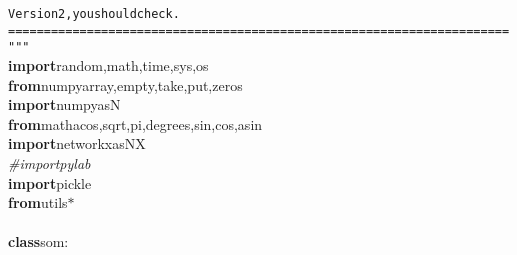 {{\begin{tabbing}
{\texttt{Version\hspace{6pt}2,\hspace{6pt}you\hspace{6pt}should\hspace{6pt}check.}}\\
{\texttt{======================================================================}}\\
{\texttt{\string"}}{\texttt{\string"\string"}}\\
{\textbf{import}}\hspace{6pt}random,math,time,sys,os\\
{\textbf{from}}\hspace{6pt}numpy\hspace{6pt}array,empty,take,put,zeros\\
{\textbf{import}}\hspace{6pt}numpy\hspace{6pt}as\hspace{6pt}N\\
{\textbf{from}}\hspace{6pt}math\hspace{6pt}acos,sqrt,pi,degrees,sin,cos,asin\\
{\textbf{import}}\hspace{6pt}networkx\hspace{6pt}as\hspace{6pt}NX\\
{\it{\#import\hspace{6pt}pylab}}\\
{\textbf{import}}\hspace{6pt}pickle\\
{\textbf{from}}\hspace{6pt}utils\hspace{6pt}$\ast$\\
\\
{\textbf{class}}\hspace{6pt}som:\\
\\

\end{tabbing}}}
